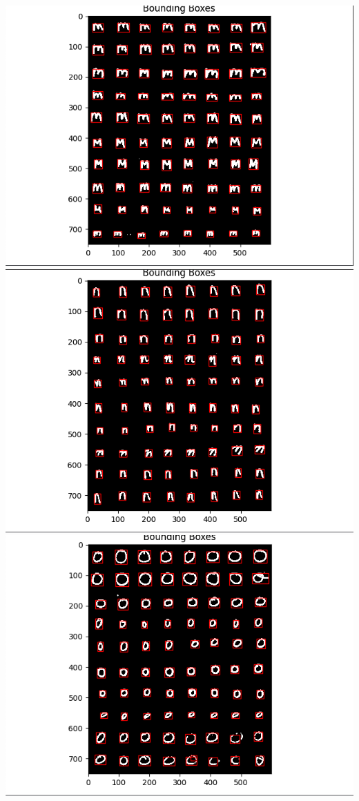 \documentclass[12pt]{article}
\begin{document}
\includegraphics*[scale=0.5]{mBounds} \\
\includegraphics*[scale=0.5]{nBounds} \\
\includegraphics*[scale=0.5]{oBounds} \\
\end{document}
